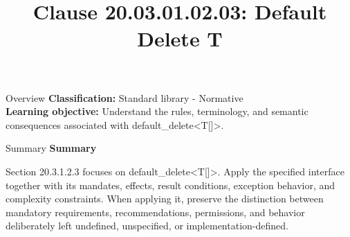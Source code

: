 \documentclass[10pt,letterpaper]{article}
\title{Clause 20.03.01.02.03: Default Delete T}
\author{}
\date{}
\begin{document}
\maketitle
\begin{CornellOverviewBox}{Overview}
\textbf{Classification:} Standard library - Normative\\[2pt]
\textbf{Learning objective:} Understand the rules, terminology, and semantic consequences associated with default\_delete<T[]>.
\end{CornellOverviewBox}\begin{CornellSummaryBox}{Summary}
{\sffamily\bfseries\color{Accent} Summary}\par\vspace{3pt}Section 20.3.1.2.3 focuses on default\_delete<T[]>. Apply the specified interface together with its mandates, effects, result conditions, exception behavior, and complexity constraints. When applying it, preserve the distinction between mandatory requirements, recommendations, permissions, and behavior deliberately left undefined, unspecified, or implementation-defined.
\end{CornellSummaryBox}
\end{document}
